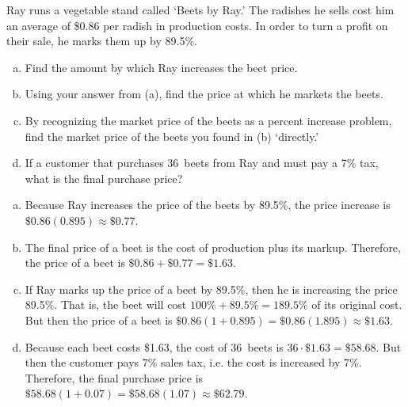 \documentclass[11pt,letterpaper]{article}
\begin{document}

 Ray runs a vegetable stand called `Beets by Ray.' The radishes he sells cost him an average of \$0.86 per radish in production costs. In order to turn a profit on their sale, he marks them up by 89.5\%.
	\begin{enumerate}[(a)]
	\item Find the amount by which Ray increases the beet price.
	\item Using your answer from (a), find the price at which he markets the beets.
	\item By recognizing the market price of the beets as a percent increase problem, find the market price of the beets you found in (b) `directly.'
	\item If a customer that purchases 36~beets from Ray and must pay a 7\% tax, what is the final purchase price?
	\end{enumerate} \pspace

\sol 
\begin{enumerate}[(a)]
\item Because Ray increases the price of the beets by 89.5\%, the price increase is $\$0.86(0.895) \approx \$0.77$. \pspace

\item The final price of a beet is the cost of production plus its markup. Therefore, the price of a beet is $\$0.86 + \$0.77= \$1.63$. \pspace

\item If Ray marks up the price of a beet by 89.5\%, then he is increasing the price 89.5\%. That is, the beet will cost $100\% + 89.5\%= 189.5\%$ of its original cost. But then the price of a beet is $\$0.86 (1 + 0.895)= \$0.86(1.895) \approx \$1.63$. \pspace

\item Because each beet costs \$1.63, the cost of 36~beets is $36 \cdot \$1.63= \$58.68$. But then the customer pays 7\% sales tax, i.e. the cost is increased by 7\%. Therefore, the final purchase price is $\$58.68(1 + 0.07)= \$58.68(1.07) \approx \$62.79$. 
\end{enumerate}



\newpage
\end{document}
